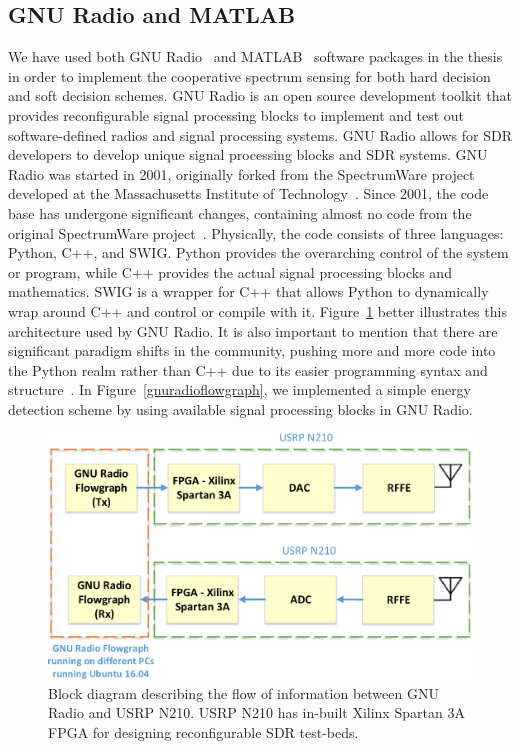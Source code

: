 \subsection{GNU Radio and MATLAB}
We have used both GNU Radio~\cite{gnradio} and MATLAB~\cite{matlab} software packages in the thesis in order to implement the cooperative spectrum sensing for both hard decision and soft decision schemes. GNU Radio is an open source development toolkit that provides reconfigurable signal processing blocks to implement and test out software-defined radios and signal processing systems. GNU Radio allows for SDR developers to develop unique signal processing blocks and SDR systems. GNU Radio was started in 2001, originally forked from the SpectrumWare project developed at the Massachusetts Institute of Technology~\cite{Tennenhouse:1995:SSA:215530.215551}. Since 2001, the code base has undergone significant changes, containing almost no code from the original SpectrumWare project~\cite{bose1999virtual}. Physically, the code consists of three languages: Python, C++, and SWIG. Python provides the overarching control of the system or program, while C++ provides the actual signal processing blocks and mathematics. SWIG is a wrapper for C++ that allows Python to dynamically wrap around C++ and control or compile with it. Figure~\ref{gnuradio} better illustrates this architecture used by GNU Radio. It is also important to mention that there are significant paradigm shifts in the community, pushing more and more code into the Python realm rather than C++ due to its easier programming syntax and structure~\cite{collins2013implementation}. In Figure~\ref{gnuradioflowgraph}, we implemented a simple energy detection scheme by using available signal processing blocks in GNU Radio.

\begin{figure}[ht!]
	\centering
	\includegraphics[width=\textwidth,keepaspectratio]{images/Gill/figs/gnuradio.eps}
    \caption{Block diagram describing the flow of information between GNU Radio and USRP N210. USRP N210 has in-built Xilinx Spartan 3A FPGA for designing reconfigurable SDR test-beds.} 
\label{gnuradio}      
\end{figure}

